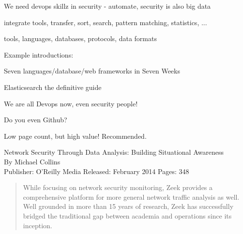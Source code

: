 \documentclass[20pt,landscape,a4paper,footrule]{foils}
\begin{document}
\begin{list1}
\item We need devops skillz in security - automate, security is also big data
\item integrate tools, transfer, sort, search, pattern matching, statistics, ...
\item tools, languages, databases, protocols, data formats
\item Example introductions:
\begin{list2}
\item Seven languages/database/web frameworks in Seven Weeks
\item Elasticsearch the definitive guide\\
\item {}
\item {}
\end{list2}
\end{list1}

\centerline{We are all Devops now, even security people!}

Do you even Github? \smiley {}



Low page count, but high value! Recommended.

Network Security Through Data Analysis: Building Situational Awareness\\
By Michael Collins\\
Publisher: O'Reilly Media
Released: February 2014 Pages: 348





\begin{quote}
While focusing on network security monitoring, Zeek provides a comprehensive platform for more general network traffic analysis as well. Well grounded in more than 15 years of research, Zeek has successfully bridged the traditional gap between academia and operations since its inception.
\end{quote}


\end{document}

